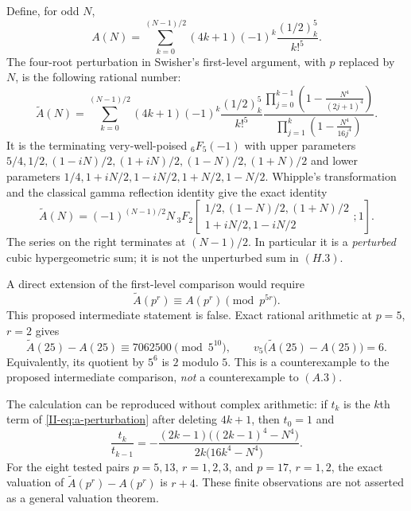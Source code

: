 \documentclass[11pt,letterpaper]{article}
\numberwithin{equation}{section}
\begin{document}
Define, for odd $N$,
\[
 A(N)=\sum_{k=0}^{(N-1)/2}(4k+1)(-1)^k\frac{(1/2)_k^5}{k!^5}.
\]
The four-root perturbation in Swisher's first-level argument, with $p$
replaced by $N$, is the following rational number:
\begin{equation}\label{II-eq:a-perturbation}
 \widetilde A(N)=\sum_{k=0}^{(N-1)/2}
 (4k+1)(-1)^k\frac{(1/2)_k^5}{k!^5}
 \frac{\displaystyle\prod_{j=0}^{k-1}
       \left(1-\frac{N^4}{(2j+1)^4}\right)}
      {\displaystyle\prod_{j=1}^{k}
       \left(1-\frac{N^4}{16j^4}\right)}.
\end{equation}
It is the terminating very-well-poised ${}_6F_5(-1)$ with upper
parameters $5/4,1/2,(1-iN)/2,(1+iN)/2,(1-N)/2,(1+N)/2$
and lower parameters $1/4,1+iN/2,1-iN/2,1+N/2,1-N/2$.
Whipple's transformation and the classical gamma reflection identity
give the exact identity
\begin{equation}\label{II-eq:a-whipple}
 \widetilde A(N)=(-1)^{(N-1)/2}N\,
 {}_3F_2\!\left[
 \begin{matrix}1/2,(1-N)/2,(1+N)/2\\
                 1+iN/2,1-iN/2\end{matrix};1\right].
\end{equation}
The series on the right terminates at $(N-1)/2$. In particular it is a
\emph{perturbed} cubic hypergeometric sum; it is not the unperturbed
sum in $(H.3)$.

A direct extension of the first-level comparison would require
\[
 \widetilde A(p^r)\equiv A(p^r)\pmod{p^{5r}}.
\]
This proposed intermediate statement is false. Exact rational
arithmetic at $p=5$, $r=2$ gives
\begin{equation}\label{II-eq:a-bridge-failure}
 \widetilde A(25)-A(25)\equiv7062500\pmod{5^{10}},
 \qquad
 v_5\bigl(\widetilde A(25)-A(25)\bigr)=6.
\end{equation}
Equivalently, its quotient by $5^6$ is $2$ modulo $5$.
This is a counterexample to the proposed intermediate comparison,
\emph{not} a counterexample to $(A.3)$.

The calculation can be reproduced without complex arithmetic: if
$t_k$ is the $k$th term of \eqref{II-eq:a-perturbation} after deleting
$4k+1$, then $t_0=1$ and
\[
 \frac{t_k}{t_{k-1}}=
 -\frac{(2k-1)\bigl((2k-1)^4-N^4\bigr)}
        {2k\bigl(16k^4-N^4\bigr)}.
\]
For the eight tested pairs $p=5,13$, $r=1,2,3$, and $p=17$, $r=1,2$,
the exact valuation of $\widetilde A(p^r)-A(p^r)$ is $r+4$.
These finite observations are not asserted as a general valuation theorem.
\end{document}
